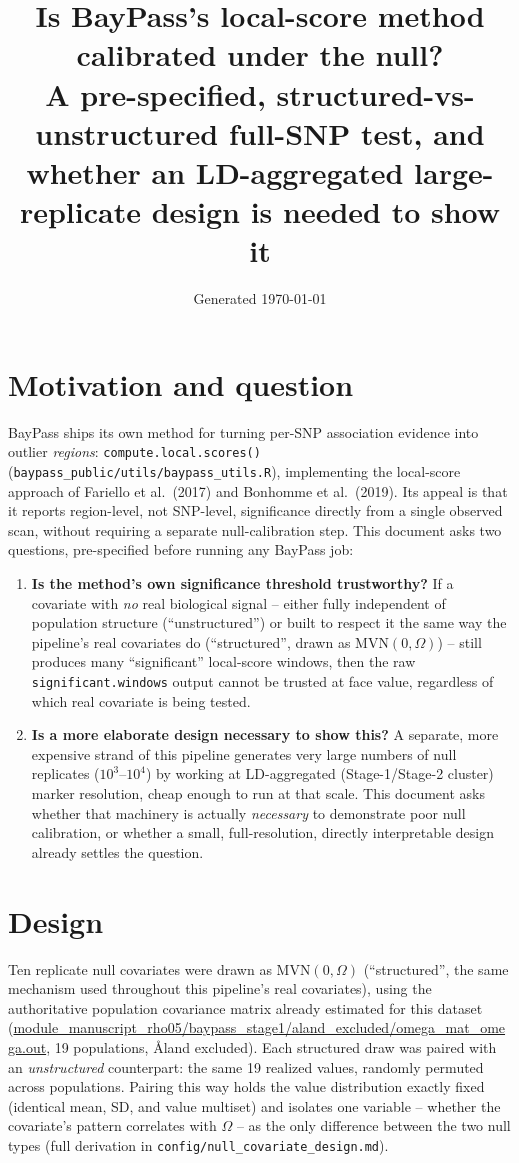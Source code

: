 \documentclass[11pt]{article}
\title{\vspace{-3em}\textbf{\color{Accent}Is BayPass's local-score method calibrated under the null?}\\[0.2em]
\large A pre-specified, structured-vs-unstructured full-SNP test, and whether an
LD-aggregated large-replicate design is needed to show it}
\author{}
\date{\small Generated \today}
\begin{document}
\maketitle
\vspace{-2em}

\section*{\color{Accent}Motivation and question}
BayPass ships its own method for turning per-SNP association evidence into outlier
\emph{regions}: \texttt{compute.local.scores()} (\texttt{baypass\_public/utils/baypass\_utils.R}),
implementing the local-score approach of Fariello et al.\ (2017) and Bonhomme et al.\ (2019). Its
appeal is that it reports region-level, not SNP-level, significance directly from a single
observed scan, without requiring a separate null-calibration step. This document asks two
questions, pre-specified before running any BayPass job:

\begin{enumerate}
\item \textbf{Is the method's own significance threshold trustworthy?} If a covariate with
  \emph{no} real biological signal -- either fully independent of population structure
  (``unstructured'') or built to respect it the same way the pipeline's real covariates do
  (``structured'', drawn as $\mathrm{MVN}(0,\Omega)$) -- still produces many ``significant''
  local-score windows, then the raw \texttt{significant.windows} output cannot be trusted at face
  value, regardless of which real covariate is being tested.
\item \textbf{Is a more elaborate design necessary to show this?} A separate, more expensive
  strand of this pipeline generates very large numbers of null replicates ($10^3$--$10^4$) by
  working at LD-aggregated (Stage-1/Stage-2 cluster) marker resolution, cheap enough to run at
  that scale. This document asks whether that machinery is actually \emph{necessary} to
  demonstrate poor null calibration, or whether a small, full-resolution, directly interpretable
  design already settles the question.
\end{enumerate}

\section*{\color{Accent}Design}
Ten replicate null covariates were drawn as $\mathrm{MVN}(0,\Omega)$ (``structured'', the same
mechanism used throughout this pipeline's real covariates), using the authoritative population
covariance matrix already estimated for this dataset
(\url{module_manuscript_rho05/baypass_stage1/aland_excluded/omega_mat_omega.out}, 19
populations, Åland excluded). Each structured draw was paired with an \emph{unstructured}
counterpart: the same 19 realized values, randomly permuted across populations. Pairing this way
holds the value distribution exactly fixed (identical mean, SD, and value multiset) and isolates
one variable -- whether the covariate's pattern correlates with $\Omega$ -- as the only difference
between the two null types (full derivation in \texttt{config/null\_covariate\_design.md}).
\end{document}
